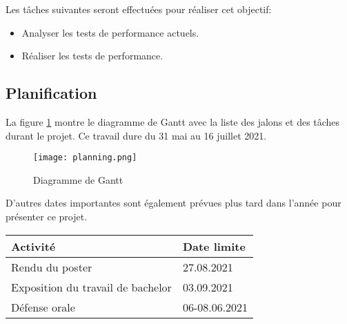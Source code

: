 Les tâches suivantes seront effectuées pour réaliser cet objectif:
\begin{itemize}
    \item Analyser les tests de performance actuels.
    \item Réaliser les tests de performance.
\end{itemize}

\begin{landscape}
\section{Planification}
La figure \ref{fig:gantt} montre le diagramme de Gantt avec la liste des jalons et des tâches durant le projet. Ce travail dure du 31 mai au 16 juillet 2021.
\begin{figure}[h!]
   \centering
    \texttt{[image: planning.png]}
    \caption{Diagramme de Gantt}
    \label{fig:gantt}
\end{figure}

D'autres dates importantes sont également prévues plus tard dans l'année pour présenter ce projet.

\begin{table}[ht]
    \begin{tabularx}{\columnwidth}{ | X | p{8em} |}
        \hline
        \textbf{Activité} & \textbf{Date limite} \\
        \hline
        Rendu du poster & 27.08.2021 \\
        Exposition du travail de bachelor & 03.09.2021 \\
        Défense orale & 06-08.06.2021 \\
        \hline
    \end{tabularx}
\end{table}

\end{landscape} 